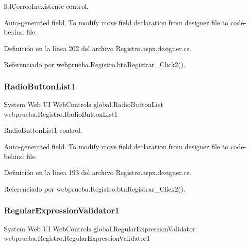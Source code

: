 lbl\+Correo\+Inexistente control. 

Auto-\/generated field. To modify move field declaration from designer file to code-\/behind file. 

Definición en la línea 202 del archivo Registro.\+aspx.\+designer.\+cs.



Referenciado por webprueba.\+Registro.\+btn\+Registrar\+\_\+\+Click2().

\mbox{\label{classwebprueba_1_1_registro_a4aa86cfab217a2d7f51bf4065b7b0293}} 
\subsubsection{\texorpdfstring{RadioButtonList1}{RadioButtonList1}}
{\footnotesize\ttfamily System Web UI Web\+Controls global.\+Radio\+Button\+List webprueba.\+Registro.\+Radio\+Button\+List1\hspace{0.3cm}{\ttfamily [protected]}}



Radio\+Button\+List1 control. 

Auto-\/generated field. To modify move field declaration from designer file to code-\/behind file. 

Definición en la línea 193 del archivo Registro.\+aspx.\+designer.\+cs.



Referenciado por webprueba.\+Registro.\+btn\+Registrar\+\_\+\+Click2().

\mbox{\label{classwebprueba_1_1_registro_a9003fdaded15daf18441dcf14d1af466}} 
\subsubsection{\texorpdfstring{RegularExpressionValidator1}{RegularExpressionValidator1}}
{\footnotesize\ttfamily System Web UI Web\+Controls global.\+Regular\+Expression\+Validator webprueba.\+Registro.\+Regular\+Expression\+Validator1\hspace{0.3cm}{\ttfamily [protected]}}



